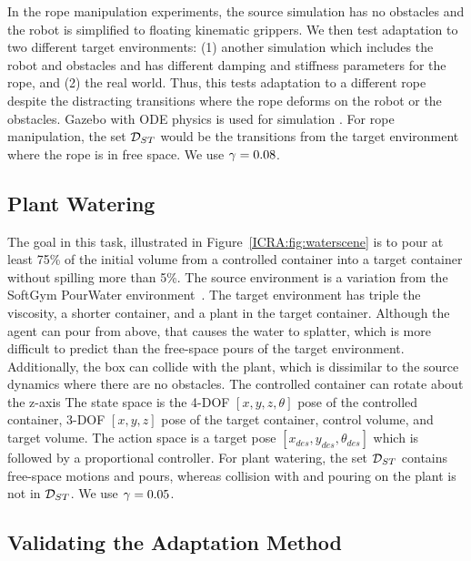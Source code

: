 In the rope manipulation experiments, the source simulation has no obstacles and the robot is simplified to floating kinematic grippers. We then test adaptation to two different target environments: (1) another simulation which includes the robot and obstacles and has different damping and stiffness parameters for the rope, and (2) the real world. Thus, this tests adaptation to a different rope despite the distracting transitions where the rope deforms on the robot or the obstacles. Gazebo with ODE physics is used for simulation \cite{Gazebo}. For rope manipulation, the set $\mathcal{D}_{ST}$ would be the transitions from the target environment where the rope is in free space. We use $\gamma=0.08$.

\subsection{Plant Watering}
\label{ICRA:sec:water}

The goal in this task, illustrated in Figure~\ref{ICRA:fig:waterscene} is to pour at least 75\% of the initial volume from a controlled container into a target container without spilling more than 5\%. The source environment is a variation from the SoftGym PourWater environment~\cite{lin2020softgym}. The target environment has triple the viscosity, a shorter container, and a plant in the target container. Although the agent can pour from above, that causes the water to splatter, which is more difficult to predict than the free-space pours of the target environment. Additionally, the box can collide with the plant, which is dissimilar to the source dynamics where there are no obstacles. The controlled container can rotate about the z-axis The state space is the 4-DOF $[x,y,z,\theta]$ pose of the controlled container, 3-DOF $[x,y,z]$ pose of the target container, control volume, and target volume. The action space is a target pose $[x_{des}, y_{des}, \theta_{des}]$ which is followed by a proportional controller. For plant watering, the set $\mathcal{D}_{ST}$ contains free-space motions and pours, whereas collision with and pouring on the plant is not in $\mathcal{D}_{ST}$. We use $\gamma=0.05$.

\subsection{Validating the Adaptation Method}
\label{ICRA:sec:validating_adaptation}

